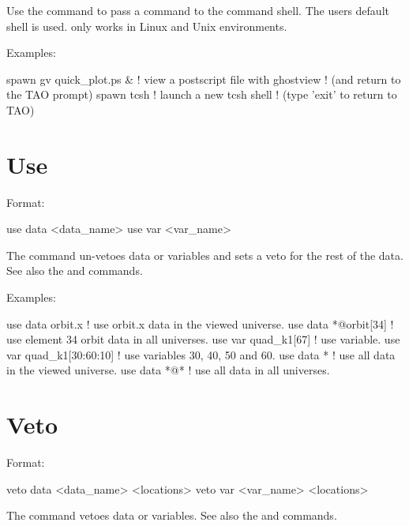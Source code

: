 {{\vskip 0.2in
Use the  command to pass a command to the command shell.  The users
default shell is used.  only works in Linux and Unix environments.

Examples:
\begin{example}
  spawn gv quick_plot.ps &      ! view a postscript file with ghostview
                                ! (and return to the TAO prompt)
  spawn tcsh                    ! launch a new tcsh shell 
                                ! (type 'exit' to return to TAO)
\end{example}

\section{Use}
\label{s:use}

Format:
\begin{example}
  use data  <data_name>
  use var <var_name>
\end{example}

\vskip 0.2in 
The  command un-vetoes data or variables and sets a veto for
the rest of the data. See also the  and 
commands.

Examples:
\begin{example}
  use data orbit.x             ! use orbit.x data in the viewed universe.
  use data *@orbit[34]         ! use element 34 orbit data in all universes.
  use var quad_k1[67]          ! use variable.
  use var quad_k1[30:60:10]    ! use variables 30, 40, 50 and 60.
  use data *                   ! use all data in the viewed universe.
  use data *@*                 ! use all data in all universes.
\end{example}


\section{Veto}
\label{s:veto}

Format:
\begin{example}
  veto data <data_name> <locations>
  veto var <var_name> <locations>
\end{example}

\vskip 0.2in 
The  command vetoes data or variables. See also the
 and  commands.

}}
